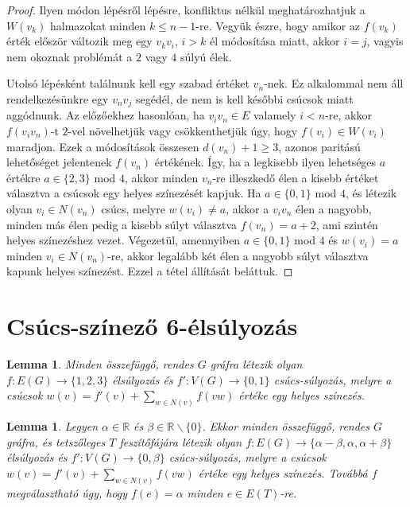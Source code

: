 \documentclass[12pt, a4paper]{report}
\newtheorem{lem}[tét]{Lemma}
\theoremstyle{remark}
\theoremstyle{definition}
\begin{document}
\begin{proof}
Ilyen módon lépésről lépésre, konfliktus nélkül meghatározhatjuk a $W(v_k)$ halmazokat minden $k \leq n - 1$-re. Vegyük észre, hogy amikor az $f(v_k)$ érték először változik meg egy $v_k v_i$, $i > k$ él módosítása miatt, akkor $i = j$, vagyis nem okoznak problémát a $2$ vagy $4$ súlyú élek.

Utolsó lépésként találnunk kell egy szabad értéket $v_n$-nek. Ez alkalommal nem áll rendelkezésünkre egy $v_n v_j$ segédél, de nem is kell későbbi csúcsok miatt aggódnunk. Az előzőekhez hasonlóan, ha $v_i v_n \in E$ valamely $i < n$-re, akkor $f(v_i v_n)$-t $2$-vel növelhetjük vagy csökkenthetjük úgy, hogy $f(v_i) \in W(v_i)$ maradjon. Ezek a módosítások összesen $d(v_n) +1 \geq 3$, azonos paritású lehetőséget jelentenek $f(v_n)$ értékének. Így, ha a legkisebb ilyen lehetséges $a$ értékre $a \in \lbrace 2, 3 \rbrace$ mod $4$, akkor minden $v_n$-re illeszkedő élen a kisebb értéket választva a csúcsok egy helyes színezését kapjuk. Ha $a \in \lbrace 0, 1 \rbrace$ mod $4$, és létezik olyan $v_i \in N(v_n)$ csúcs, melyre $w(v_i) \neq a$, akkor a $v_i v_n$ élen a nagyobb, minden más élen pedig a kisebb súlyt választva $f(v_n) = a + 2$, ami szintén helyes színezéshez vezet. Végezetül, amennyiben $a \in \lbrace 0, 1 \rbrace$ mod $4$ és $w(v_i) = a$ minden $v_i \in N(v_n)$-re, akkor legalább két élen a nagyobb súlyt választva kapunk helyes színezést. Ezzel a tétel állítását beláttuk.
\end{proof}

\section{Csúcs-színező 6-élsúlyozás}
\begin{lem}
Minden összefüggő, rendes $G$ gráfra létezik olyan $f:E(G) \rightarrow \lbrace 1, 2, 3 \rbrace$ élsúlyozás és $f':V(G) \rightarrow \lbrace 0, 1 \rbrace$ csúcs-súlyozás, melyre a csúcsok $w(v) = f'(v) + \sum\limits_{w \in N(v)} f(vw)$ értéke egy helyes színezés.
\end{lem}

\begin{lem}
Legyen $\alpha \in \mathbb{R}$ és $\beta \in \mathbb{R} \smallsetminus \lbrace 0 \rbrace$. Ekkor minden összefüggő, rendes $G$ gráfra, és tetszőleges $T$ feszítőfájára létezik olyan $f:E(G) \rightarrow \lbrace \alpha - \beta, \alpha, \alpha + \beta \rbrace$ élsúlyozás és $f':V(G) \rightarrow \lbrace 0, \beta \rbrace$ csúcs-súlyozás, melyre a csúcsok $w(v) = f'(v) + \sum\limits_{w \in N(v)} f(vw)$ értéke egy helyes színezés. Továbbá $f$ megválasztható úgy, hogy $f(e) = \alpha$ minden $e \in E(T)$-re.
\end{lem}
\end{document}
